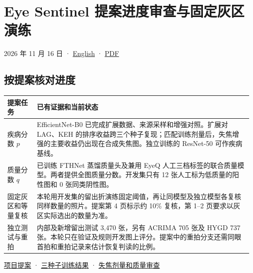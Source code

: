 \documentclass[
  10pt,
  letterpaper,
]{article}
\author{}
\date{}
\newcounter{none} %
\begin{document}
\section{Eye Sentinel
提案进度审查与固定灰区演练}\label{eye-sentinel-ux63d0ux6848ux8fdbux5ea6ux5ba1ux67e5ux4e0eux56faux5b9aux7070ux533aux6f14ux7ec3}

2026 年 11 月 16 日 · \href{proposal-review.en.md}{English} ·
\href{proposal-review.zh.pdf}{PDF}

\subsection{按提案核对进度}\label{ux6309ux63d0ux6848ux6838ux5bf9ux8fdbux5ea6}

{\def\LTcaptype{none} %
\begin{longtable}[]{@{}
  >{\raggedright\arraybackslash}p{}
  >{\raggedright\arraybackslash}p{}@{}}
\toprule\noalign{}
\begin{minipage}[b]{\linewidth}\raggedright
提案任务
\end{minipage} & \begin{minipage}[b]{\linewidth}\raggedright
已有证据和当前状态
\end{minipage} \\
\midrule\noalign{}
\endhead
\bottomrule\noalign{}
\endlastfoot
疾病分数 \(p\) & EfficientNet-B0
已完成扩展数据、来源采样和增强对照。扩展对 LAG、KEH
的排序收益跨三个种子复现；匹配训练剂量后，失焦增强的主要收益仍出现在合成失焦图。独立训练的
ResNet-50 可作疾病基线。 \\
质量分数 \(q\) & 已训练 FTHNet 蒸馏质量头及兼用 EyeQ
人工三档标签的联合质量模型。两者提供全图质量分数。开发集只有 12
张人工标为低质量的阳性图和 0 张同类阴性图。 \\
固定灰区和等量复核 &
本轮用开发集的留出折演练固定阈值，再让同模型及独立模型各复核同样数量的照片。提案第
4 页标示约 10\% 复核，第 1--2 页要求以灰区实际选出的数量为准。 \\
独立测试与重拍 & 内部及新增留出测试 3,470 张，另有 ACRIMA 705 张及 HYGD
737
张。本轮只在验证及规则开发图上评分。提案中的重拍分支还需同眼首拍和重拍记录来估计恢复判读的比例。 \\
\end{longtable}
}

\href{../../../proposal-1106.pdf}{项目提案} ·
\href{../2026-11-15/completed-experiments/completed-results.zh.md}{三种子训练结果}
· \href{quality-alignment.zh.md}{失焦剂量和质量审查}
\end{document}
